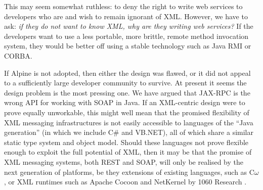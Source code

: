 This may seem somewhat ruthless: to deny the right to write web
services to developers who are and wish to remain ignorant of XML.
However, we have to ask: \emph{if they do not want to know XML, why are
they writing web services?} If the developers want to use a less portable,
more brittle, remote method invocation system, they would be better off
using a stable technology such as Java RMI or CORBA.

If Alpine is not adopted, then either the design was flawed,
or it did not appeal to a sufficiently large developer community to survive. At
present it seems the design problem is the most pressing one. We have argued that JAX-RPC is the
wrong API for working with SOAP in Java. If an XML-centric design were to prove
equally unworkable, this might well mean that the promised flexibility of
XML messaging infrastructures is not easily accessible to languages of the ``Java 
generation'' (in which we include C\# and VB.NET), all of which share a similar
static type system and object model. Should these languages not prove flexible enough
to exploit the full potential of XML, then it may be that the promise of XML messaging 
systems, both REST and SOAP, will only be realised by the next generation of platforms, be they
extensions of existing languages, such as C$\omega$, or XML runtimes such as
Apache Cocoon and NetKernel by 1060 Research
\cite{MSFT:TransitionsInProgrammingModels,pjr:NKonXml}.
